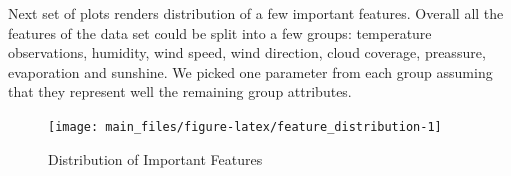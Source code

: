 \begin{table}[ht]
\centering
{}
\caption{\tt Weather Obesrvations Data Sample} 
\label{data_head}
\end{table}

Next set of plots renders distribution of a few important features.
Overall all the features of the data set could be split into a few
groups: temperature observations, humidity, wind speed, wind direction,
cloud coverage, preassure, evaporation and sunshine. We picked one
parameter from each group assuming that they represent well the
remaining group attributes.

\begin{Schunk}
\begin{figure}[H]

{\centering \texttt{[image: main\_files/figure-latex/feature\_distribution-1]} 

}

\caption[ Distribution of Important Features]{ Distribution of Important Features}\label{fig:feature_distribution}
\end{figure}
\end{Schunk}

